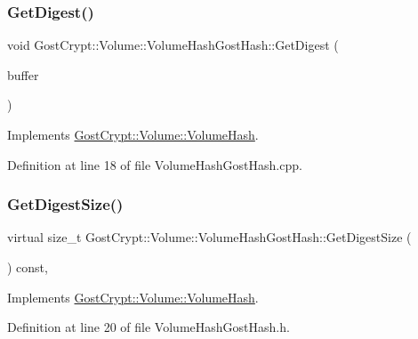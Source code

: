 \subsubsection{\texorpdfstring{Get\+Digest()}{GetDigest()}}
{\footnotesize\ttfamily void Gost\+Crypt\+::\+Volume\+::\+Volume\+Hash\+Gost\+Hash\+::\+Get\+Digest (\begin{DoxyParamCaption}\item[{\hyperlink{class_gost_crypt_1_1_buffer_ptr}{Buffer\+Ptr} \&}]{buffer }\end{DoxyParamCaption})\hspace{0.3cm}{\ttfamily [virtual]}}



Implements \hyperlink{class_gost_crypt_1_1_volume_1_1_volume_hash_a8ae75f9cc4beea8ecb8751ecb221c797}{Gost\+Crypt\+::\+Volume\+::\+Volume\+Hash}.



Definition at line 18 of file Volume\+Hash\+Gost\+Hash.\+cpp.

\mbox{\label{class_gost_crypt_1_1_volume_1_1_volume_hash_gost_hash_ae81d30ef1de076a62769fde28057762e}} 
\subsubsection{\texorpdfstring{Get\+Digest\+Size()}{GetDigestSize()}}
{\footnotesize\ttfamily virtual size\+\_\+t Gost\+Crypt\+::\+Volume\+::\+Volume\+Hash\+Gost\+Hash\+::\+Get\+Digest\+Size (\begin{DoxyParamCaption}{ }\end{DoxyParamCaption}) const\hspace{0.3cm}{\ttfamily [inline]}, {\ttfamily [virtual]}}



Implements \hyperlink{class_gost_crypt_1_1_volume_1_1_volume_hash_a3677448f436ac856778274dafdc36ed4}{Gost\+Crypt\+::\+Volume\+::\+Volume\+Hash}.



Definition at line 20 of file Volume\+Hash\+Gost\+Hash.\+h.

\mbox{\label{class_gost_crypt_1_1_volume_1_1_volume_hash_gost_hash_a2ee1b3df04a1ae01cfebb0049a5c6b6f}} 
